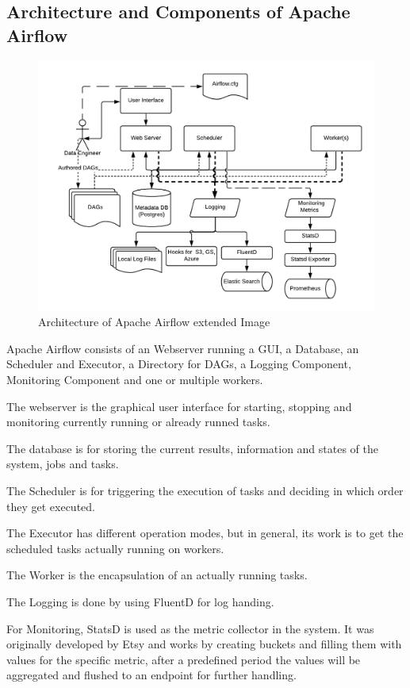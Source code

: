 \documentclass[lettersize,journal]{IEEEtran}
\begin{document}
	\subsection{Architecture and Components of Apache Airflow}
	
	\begin{figure}[h]
		\includegraphics[width=\linewidth]{images/arch-diag-logging.png}
		\caption{Architecture of Apache Airflow extended Image}
		\label{fig:airflow_arch_logging}
	\end{figure}
	
	
	Apache Airflow consists of an Webserver running a GUI, a Database, an Scheduler and Executor, a Directory for DAGs, a Logging Component, Monitoring Component and one or multiple workers.
	
	The webserver is the graphical user interface for starting, stopping and monitoring currently running or already runned tasks.
	
	The database is for storing the current results, information and states of the system, jobs and tasks.
	
	The Scheduler is for triggering the execution of tasks and deciding in which order they get executed.
	
	The Executor has different operation modes, but in general, its work is to get the scheduled tasks actually running on workers.
	
	The Worker is the encapsulation of an actually running tasks.
	
	The Logging is done by using FluentD for log handing.
	
	For Monitoring, StatsD is used as the metric collector in the system. \cite{statsd} 
	It was originally developed by Etsy and works by creating buckets and filling them with values for the specific metric, after a predefined period the values will be aggregated and flushed to an endpoint for further handling. 
	
\end{document}
